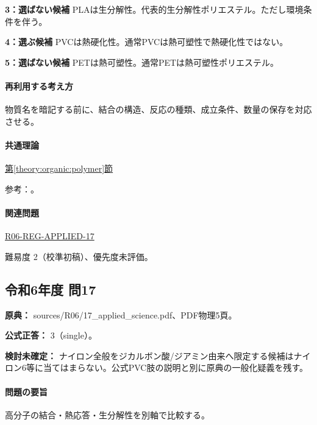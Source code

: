 \noindent\textbf{3：選ばない候補} PLAは生分解性。代表的生分解性ポリエステル。ただし環境条件を伴う。\par

\noindent\textbf{4：選ぶ候補} PVCは熱硬化性。通常PVCは熱可塑性で熱硬化性ではない。\par

\noindent\textbf{5：選ばない候補} PETは熱可塑性。通常PETは熱可塑性ポリエステル。\par

\paragraph{再利用する考え方} 物質名を暗記する前に、結合の構造、反応の種類、成立条件、数量の保存を対応させる。

\paragraph{共通理論} \hyperref[theory:organic:polymer]{第\ref*{theory:organic:polymer}節}

\par 参考：\cite{organic_physical,organic_step,organic_jbpa}。

\paragraph{関連問題} \hyperref[q:r06-reg-applied-17]{R06-REG-APPLIED-17}

\par 難易度 2（校準初稿）、優先度未評価。

\subsection{令和6年度 問17}
\label{q:r06-reg-applied-17}

\noindent\textbf{原典：} sources/R06/17\_applied\_science.pdf、PDF物理5頁。

\textbf{公式正答：} 3（single）。

\par\textbf{検討未確定：} ナイロン全般をジカルボン酸/ジアミン由来へ限定する候補はナイロン6等に当てはまらない。公式PVC肢の説明と別に原典の一般化疑義を残す。

\paragraph{問題の要旨} 高分子の結合・熱応答・生分解性を別軸で比較する。


